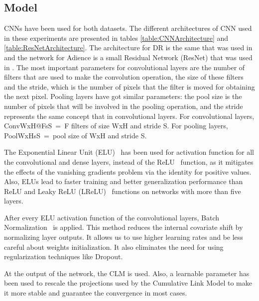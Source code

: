 \documentclass[journal]{IEEEtran}
\begin{document}
	\subsection{Model}
	\label{sect:model}
	CNNs have been used for both datasets. The different architectures of CNN used in these experiments are presented in tables \ref{table:CNNArchitecture} and \ref{table:ResNetArchitecture}. The architecture for DR is the same that was used in \cite{de2018weighted} and the network for Adience is a small Residual Network (ResNet) \cite{he2016deep} that was used in \cite{beckham2017unimodal}. The most important parameters for convolutional layers are the number of filters that are used to make the convolution operation, the size of these filters and the stride, which is the number of pixels that the filter is moved for obtaining the next pixel. Pooling layers have got similar parameters: the pool size is the number of pixels that will be involved in the pooling operation, and the stride represents the same concept that in convolutional layers. For convolutional layers, ConvWxH@FsS~=~F filters of size WxH and stride S. For pooling layers, PoolWxHsS~=~pool size of WxH and stride S.
	
	The Exponential Linear Unit (ELU)~\cite{clevert2015fast} has been used for activation function for all the convolutional and dense layers, instead of the ReLU~\cite{nair2010rectified} function, as it mitigates the effects of the vanishing gradients problem \cite{bengio1994learning,pascanu2013difficulty} via the identity for positive values. Also, ELUs lead to faster training and better generalization performance than ReLU and Leaky ReLU (LReLU)~\cite{maas2013rectifier} functions on networks with more than five layers.
	
	After every ELU activation function of the convolutional layers, Batch Normalization~\cite{ioffe2015batch} is applied. This method reduces the internal covariate shift by normalizing layer outputs. It allows us to use higher learning rates and be less careful about weights initialization. It also eliminates the need for using regularization techniques like Dropout.
	
	At the output of the network, the CLM is used. Also, a learnable parameter has been used to rescale the projections used by the Cumulative Link Model to make it more stable and guarantee the convergence in most cases. 
	
\end{document}
